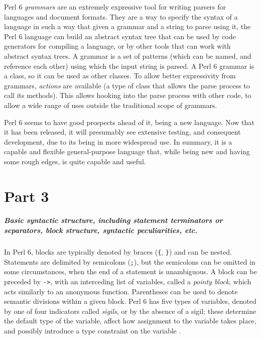 \documentclass[14pt,english]{extarticle}
\begin{document}
Perl 6 \emph{grammars} are an extremely expressive tool for writing
parsers for languages and document formats. \cite{Documentation}
They are a way to specify the syntax of a language in such a way that
given a grammar and a string to parse using it, the Perl 6 language
can build an abstract syntax tree that can be used by code generators
for compiling a language, or by other tools that can work with abstract
syntax trees. A grammar is a set of patterns (which can be named,
and reference each other) using which the input string is parsed.
A Perl 6 grammar is a class, so it can be used as other classes. To
allow better expressivity from grammars, \emph{actions} are available
(a type of class that allows the parse process to call its methods).
\cite{Documentation_2} This allows hooking into the parse process
with other code, to allow a wide range of uses outside the traditional
scope of grammars.

Perl 6 seems to have good prospects ahead of it, being a new language.
Now that it has been released, it will presumably see extensive testing,
and consequent development, due to its being in more widespread use.
In summary, it is a capable and flexible general-purpose language
that, while being new and having some rough edges, is quite capable
and useful.


\part*{Part 3}


\subsubsection*{Basic syntactic structure, including statement terminators or separators,
block structure, syntactic peculiarities, etc.}

In Perl 6, blocks are typically denoted by braces (\texttt{\{}, \texttt{\}})
and can be nested. Statements are delimited by semicolons (\texttt{;}),
but the semicolons can be omitted in some circumstances, when the
end of a statement is unambiguous. A block can be preceded by \texttt{-‌>},
with an interceding list of variables, called a \emph{pointy block},
which acts similarly to an anonymous function. Parentheses can be
used to denote semantic divisions within a given block. Perl 6 has
five types of variables, denoted by one of four indicators called
\emph{sigils}, or by the absence of a sigil; these determine the default
type of the variable, affect how assignment to the variable takes
place, and possibly introduce a type constraint on the variable \cite{Documentation}.
\end{document}
